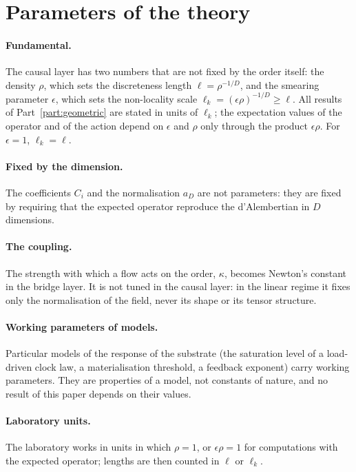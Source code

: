 \section{Parameters of the theory}\label{sec:parameters}

\paragraph{Fundamental.} The causal layer has two numbers that are not fixed by the order itself:
the density $\rho$, which sets the discreteness length $\ell=\rho^{-1/D}$, and the smearing
parameter $\epsilon$, which sets the non-locality scale $\ell_k=(\epsilon\rho)^{-1/D}\ge\ell$. All
results of Part~\ref{part:geometric} are stated in units of $\ell_k$; the expectation values of the
operator and of the action depend on $\epsilon$ and $\rho$ only through the product $\epsilon\rho$.
For $\epsilon=1$, $\ell_k=\ell$.

\paragraph{Fixed by the dimension.} The coefficients $C_i$ and the normalisation $a_D$ are not
parameters: they are fixed by requiring that the expected operator reproduce the d'Alembertian in
$D$ dimensions.

\paragraph{The coupling.} The strength with which a flow acts on the order, $\kappa$, becomes
Newton's constant in the bridge layer. It is not tuned in the causal layer: in the linear regime
it fixes only the normalisation of the field, never its shape or its tensor structure.

\paragraph{Working parameters of models.} Particular models of the response of the substrate (the
saturation level of a load-driven clock law, a materialisation threshold, a feedback exponent) carry
working parameters. They are properties of a model, not constants of nature, and no result of this
paper depends on their values.

\paragraph{Laboratory units.} The laboratory works in units in which $\rho=1$, or $\epsilon\rho=1$
for computations with the expected operator; lengths are then counted in $\ell$ or $\ell_k$.

